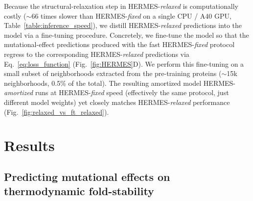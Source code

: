 Because the structural-relaxation step in HERMES-\emph{relaxed} is computationally costly ($\sim 66$
times slower than HERMES-{\em fixed} on a single CPU / A40 GPU, Table~\ref{table:inference_speed}),
we distill HERMES-\emph{relaxed} predictions into the model via a fine-tuning procedure. Concretely,
we fine-tune the model so that the mutational-effect predictions produced with the fast
HERMES-\emph{fixed} protocol regress to the corresponding HERMES-\emph{relaxed} predictions {via
Eq.~\ref{eq:loss_function}} (Fig.~\ref{fig:HERMES}D). We perform this fine-tuning on a small subset
of neighborhoods extracted from the pre-training proteins ($\sim$15k neighborhoods, 0.5\% of the
total). The resulting amortized model HERMES-{\em amortized} runs at HERMES-\emph{fixed} speed
(effectively the same protocol, just different model weights) yet closely matches
HERMES-\emph{relaxed} performance (Fig.~\ref{fig:relaxed_vs_ft_relaxed}).\\



\section{Results}

\subsection{Predicting mutational effects on thermodynamic fold-stability}
\label{sec:results_stability}

